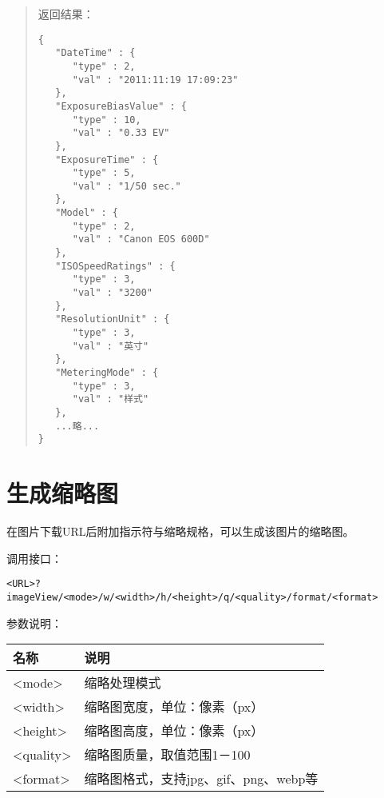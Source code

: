 \documentclass[11pt, oneside]{book}
\newcommand{\qpar}[1]{
\vspace{0.25em}
\noindent
#1\par
\vspace{0.25em}
}
\newcommand{\qqbox}[1]{\hspace{0.2em}\fbox{#1}\hspace{0.2em}}
\newcommand{\qtable}[1]{\vspace{0.5em}#1\vspace{0.5em}}
\begin{document}
\begin{CJK*}{UTF8}{song}
\begin{quote}
返回结果：
\begin{verbatim}
{
   "DateTime" : {
      "type" : 2,
      "val" : "2011:11:19 17:09:23"
   },
   "ExposureBiasValue" : {
      "type" : 10,
      "val" : "0.33 EV"
   },
   "ExposureTime" : {
      "type" : 5,
      "val" : "1/50 sec."
   },
   "Model" : {
      "type" : 2,
      "val" : "Canon EOS 600D"
   },
   "ISOSpeedRatings" : {
      "type" : 3,
      "val" : "3200"
   },
   "ResolutionUnit" : {
      "type" : 3,
      "val" : "英寸"
   },
   "MeteringMode" : {
      "type" : 3,
      "val" : "样式"
   },
   ...略...
}
\end{verbatim}
\end{quote}

\clearpage

\section{生成缩略图}

\qpar{在图片下载URL后附加\qqbox{imageView}指示符与缩略规格，可以生成该图片的缩略图。}
\qpar{调用接口：}
\begin{lstlisting}[basicstyle=\ttfamily\footnotesize]
<URL>?imageView/<mode>/w/<width>/h/<height>/q/<quality>/format/<format>
\end{lstlisting}

\qpar{参数说明：}
\qtable{
\def\arraystretch{1.5}
\begin{tabular}{|l|l|}
\hline
名称 & 说明 \\
\hline
\textless mode\textgreater & 缩略处理模式 \\
\hline
\textless width\textgreater & 缩略图宽度，单位：像素（px） \\
\hline
\textless height\textgreater & 缩略图高度，单位：像素（px） \\
\hline
\textless quality\textgreater & 缩略图质量，取值范围1－100 \\
\hline
\textless format\textgreater & 缩略图格式，支持jpg、gif、png、webp等 \\
\hline
\end{tabular}
}

\end{CJK*}
\end{document}
